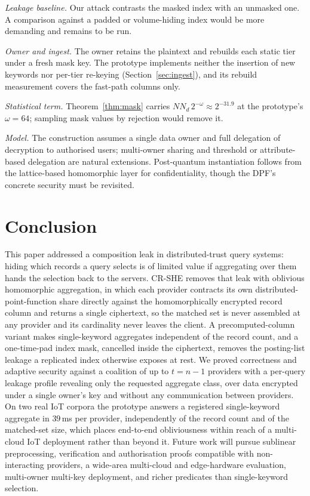 \documentclass[a4paper,fleqn]{cas-dc}
\begin{document}
\emph{Leakage baseline.} Our attack contrasts the masked index with an
unmasked one. A comparison against a padded or volume-hiding index
\citep{kamara2019computationally,patel2019mitigating} would be more demanding
and remains to be run.

\emph{Owner and ingest.} The owner retains the plaintext and rebuilds each
static tier under a fresh mask key. The prototype implements neither the
insertion of new keywords nor per-tier re-keying (Section~\ref{sec:ingest}),
and its rebuild measurement covers the fast-path columns only.

\emph{Statistical term.} Theorem~\ref{thm:mask} carries
$N N_d\,2^{-\omega}\approx2^{-31.9}$ at the prototype's $\omega=64$; sampling
mask values by rejection would remove it.

\emph{Model.} The construction assumes a single data owner and full delegation
of decryption to authorised users; multi-owner sharing and threshold or
attribute-based delegation are natural extensions. Post-quantum instantiation
follows from the lattice-based homomorphic layer for confidentiality, though
the DPF's concrete security must be revisited.

\section{Conclusion}
\label{sec:conclusion}

This paper addressed a composition leak in distributed-trust query systems:
hiding which records a query selects is of limited value if aggregating over
them hands the selection back to the servers. CR-SHE removes that leak with
oblivious homomorphic aggregation, in which each provider contracts its own
distributed-point-function share directly against the homomorphically
encrypted record column and returns a single ciphertext, so the matched set is
never assembled at any provider and its cardinality never leaves the client. A
precomputed-column variant makes single-keyword aggregates independent of the
record count, and a one-time-pad index mask, cancelled inside the ciphertext,
removes the posting-list leakage a replicated index otherwise exposes at rest.
We proved correctness and adaptive security against a coalition of up to
$t=n-1$ providers with a per-query leakage profile revealing only the
requested aggregate class, over data encrypted under a single owner's key and
without any communication between providers. On two real IoT corpora the
prototype answers a registered single-keyword aggregate in $39$\,ms per
provider, independently of the record count and of the matched-set size,
which places end-to-end obliviousness within reach of a multi-cloud IoT
deployment rather than beyond it. Future work will pursue sublinear
preprocessing, verification and authorisation proofs compatible with
non-interacting providers, a wide-area multi-cloud and edge-hardware
evaluation, multi-owner multi-key deployment, and richer predicates than
single-keyword selection.
\end{document}
